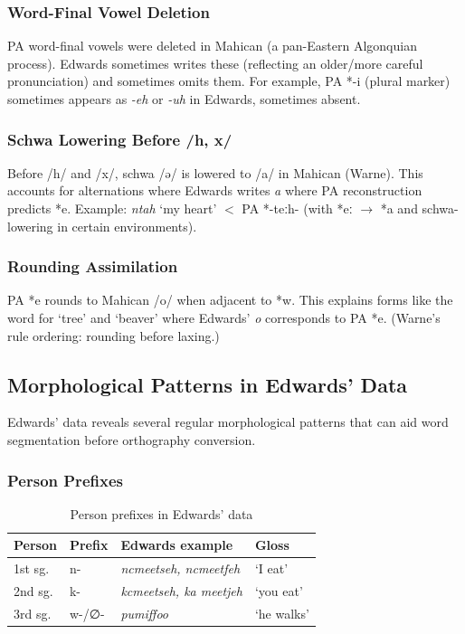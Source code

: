 \subsubsection{Word-Final Vowel Deletion}

PA word-final vowels were deleted in Mahican (a pan-Eastern Algonquian
process). Edwards sometimes writes these (reflecting an older/more careful
pronunciation) and sometimes omits them. For example, PA *-i (plural marker)
sometimes appears as \textit{-eh} or \textit{-uh} in Edwards, sometimes
absent.

\subsubsection{Schwa Lowering Before /h, x/}

Before /h/ and /x/, schwa /ə/ is lowered to /a/ in Mahican (Warne).
This accounts for alternations where Edwards writes \textit{a} where PA
reconstruction predicts *e. Example: \textit{ntah} `my heart' $<$ PA *-teːh-
(with *eː $\rightarrow$ *a and schwa-lowering in certain environments).

\subsubsection{Rounding Assimilation}

PA *e rounds to Mahican /o/ when adjacent to *w. This explains forms like
the word for `tree' and `beaver' where Edwards' \textit{o} corresponds to PA
*e. (Warne's rule ordering: rounding before laxing.)

\subsection{Morphological Patterns in Edwards' Data}

Edwards' data reveals several regular morphological patterns that can aid
word segmentation before orthography conversion.

\subsubsection{Person Prefixes}

\begin{table}[h]
\centering
\begin{tabular}{llll}
\toprule
\textbf{Person} & \textbf{Prefix} & \textbf{Edwards example} & \textbf{Gloss} \\
\midrule
1st sg. & n- & \textit{ncmeetseh, ncmeetfeh} & `I eat' \\
2nd sg. & k- & \textit{kcmeetseh, ka meetjeh} & `you eat' \\
3rd sg. & w-/∅- & \textit{pumiffoo} & `he walks' \\
\bottomrule
\end{tabular}
\caption{Person prefixes in Edwards' data}
\label{tab:1369-prefixes}
\end{table}

